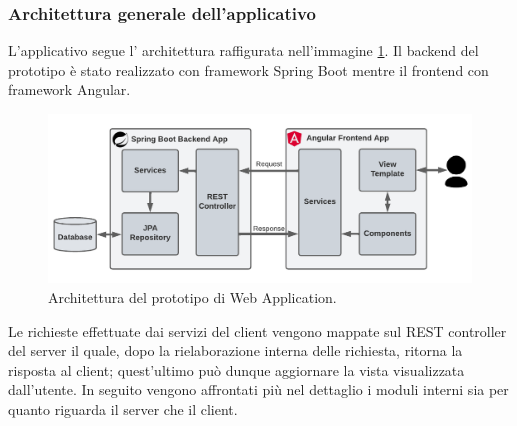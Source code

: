 \subsubsection*{Architettura generale dell'applicativo}
L'applicativo segue l' architettura raffigurata nell'immagine \ref{prototype-architecture}. Il backend del prototipo è stato realizzato con framework Spring Boot mentre il frontend con framework Angular.
\FloatBarrier
\begin{figure}[!h]
\centering
\includegraphics[width=1\linewidth]{immagini/prototypeArchitecture.pdf}
\caption{Architettura del prototipo di Web Application.}
\label{prototype-architecture}
\end{figure}
\FloatBarrier
Le richieste effettuate dai servizi del client vengono mappate sul REST controller del server il quale, dopo la rielaborazione interna delle richiesta, ritorna la risposta al client; quest'ultimo può dunque aggiornare la vista visualizzata dall'utente. In seguito vengono affrontati più nel dettaglio i moduli interni sia per quanto riguarda il server che il client.
